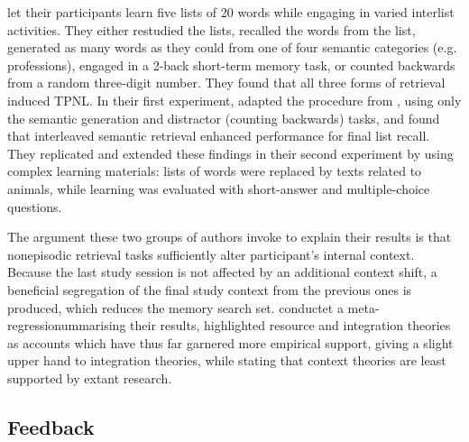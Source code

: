 \documentclass[../main.tex]{subfiles}
\begin{document}
\cite{pastotterRetrievalLearningFacilitates2011} let their participants learn five lists of 20 words while engaging in varied interlist activities. They either restudied the lists, recalled the words from the list, generated as many words as they could from one of four semantic categories (e.g. professions), engaged in a 2-back short-term memory task, or counted backwards from a random three-digit number. They found that all three forms of retrieval induced TPNL. In their first experiment, \cite{divisRetrievalSpeedsContext2014} adapted the procedure from \cite{pastotterRetrievalLearningFacilitates2011}, using only the semantic generation and distractor (counting backwards) tasks, and found that interleaved semantic retrieval enhanced performance for final list recall. They replicated and extended these findings in their second experiment by using complex learning materials: lists of words were replaced by texts related to animals, while learning was evaluated with short-answer and multiple-choice questions. 

The argument these two groups of authors invoke to explain their results is that nonepisodic retrieval tasks sufficiently alter participant's internal context. Because the last study session is not affected by an additional context shift, a beneficial segregation of the final study context from the previous ones is produced, which reduces the memory search set. \cite{chanRetrievalPotentiatesNew2018} conductet a meta-regressionummarising their results, \cite{chanRetrievalPotentiatesNew2018} highlighted resource and integration theories as accounts which have thus far garnered more empirical support, giving a slight upper hand to integration theories, while stating that context theories are least supported by extant research.


\hypertarget{feedback}{%
\subsection{Feedback}}
\end{document}
